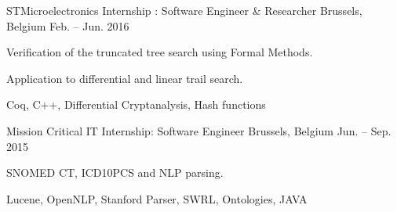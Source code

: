 \begin{cventries}
	\cventrysix%
	{STMicroelectronics} %
	{Internship : Software Engineer \& Researcher} %
	{Brussels, Belgium} %
	{Feb. -- Jun. 2016} %
	{
		\begin{cvitems} %
			\item {Verification of the truncated tree search using Formal Methods.} %
			\item {Application to differential and linear trail search.} %
		\end{cvitems}
	}%
	{Coq, C++, Differential Cryptanalysis, Hash functions}%

	\cventrysix%
	{Mission Critical IT} %
	{Internship: Software Engineer} %
	{Brussels, Belgium} %
	{Jun. -- Sep. 2015} %
	{
		\begin{cvitems} %
			\item {SNOMED CT, ICD10PCS and NLP parsing.}
		\end{cvitems}
	}%
	{Lucene, OpenNLP, Stanford Parser, SWRL, Ontologies, JAVA}%








\end{cventries}
